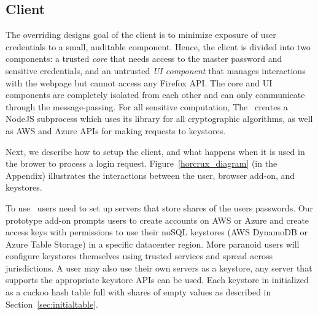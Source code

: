 
\subsection{Client}\label{sec:client}

The overriding designs goal of the client is to minimize exposure of user credentials to a small, auditable component. Hence, the client is divided into two components: a trusted \emph{core} that needs access to the master password and sensitive credentials, and an untrusted \emph{UI component} that manages interactions with the webpage but cannot access any Firefox API. The core and UI components are completely isolated from each other and can only communicate through the message-passing. For all sensitive computation, The \Core\ creates a NodeJS subprocess which uses its  library for all cryptographic algorithms\cite{cryptoAPI}, as well as AWS and Azure APIs for making requests to keystores. 

Next, we describe how to setup the client, and what happens when it is used in the brower to process a login request. Figure~\ref{horcrux_diagram} (in the Appendix) illustrates the interactions between the user, browser add-on, and keystores. 

 \label{protocol_setup}
To use \SecPass\, users need to set up servers that store shares of the users passwords. Our  prototype add-on prompts users to create accounts on AWS or Azure and create access keys with 
permissions to use their noSQL keystores (AWS DynamoDB or Azure Table Storage) in a specific 
datacenter region. More paranoid users will configure keystores themselves using trusted  services and spread across jurisdictions. A user may also use their own servers as a keystore, any server that supports the appropriate keystore APIs can be used. Each keystore in initialized as a cuckoo hash table full with shares of empty values as described in Section~\ref{sec:initialtable}.


